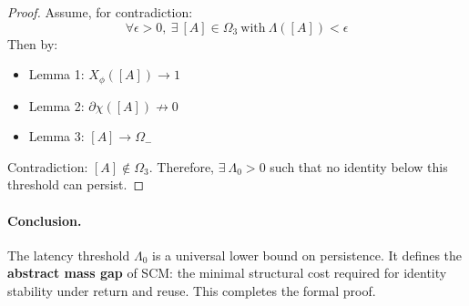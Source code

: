 \begin{proof}
Assume, for contradiction:
\[
\forall \epsilon > 0,\ \exists\ [A] \in \Omega_3\ \text{with}\ \Lambda([A]) < \epsilon
\]
Then by:
\begin{itemize}
  \item Lemma 1: $X_\phi([A]) \to 1$
  \item Lemma 2: $\partial \chi([A]) \not\to 0$
  \item Lemma 3: $[A] \to \Omega_-$
\end{itemize}

Contradiction: $[A] \notin \Omega_3$. Therefore, $\exists\ \Lambda_0 > 0$ such that no identity below this threshold can persist.
\end{proof}

\paragraph{Conclusion.}
The latency threshold $\Lambda_0$ is a universal lower bound on persistence. It defines the \textbf{abstract mass gap} of SCM: the minimal structural cost required for identity stability under return and reuse. This completes the formal proof.
